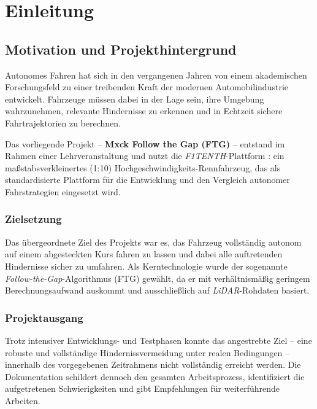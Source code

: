 \chapter{Einleitung}
\label{chap:einleitung}

\section{Motivation und Projekthintergrund}
\label{sec:motivation}

Autonomes Fahren hat sich in den vergangenen Jahren von einem
akademischen Forschungsfeld zu einer treibenden Kraft der modernen
Automobilindustrie entwickelt.
Fahrzeuge müssen dabei in der Lage sein, ihre Umgebung wahrzunehmen,
relevante Hindernisse zu erkennen und in Echtzeit sichere Fahrtrajektorien
zu berechnen.

Das vorliegende Projekt -- \textbf{Mxck Follow the Gap (FTG)} --
entstand im Rahmen einer Lehrveranstaltung und nutzt die
\emph{F1TENTH}-Plattform \cite{okelly2020f1tenth}: ein
maßstabsverkleinertes (1:10) Hochgeschwindigkeits-Rennfahrzeug,
das als standardisierte Plattform für die Entwicklung und den
Vergleich autonomer Fahrstrategien eingesetzt wird.

\subsection*{Zielsetzung}

Das übergeordnete Ziel des Projekts war es, das Fahrzeug
vollständig autonom auf einem abgesteckten Kurs fahren zu lassen
und dabei alle auftretenden Hindernisse sicher zu umfahren.
Als Kerntechnologie wurde der sogenannte
\emph{Follow-the-Gap}-Algorithmus (FTG) \cite{sezer2012novel}
gewählt, da er mit verhältnismäßig geringem Berechnungsaufwand
auskommt und ausschließlich auf \emph{LiDAR}-Rohdaten basiert.

\subsection*{Projektausgang}

Trotz intensiver Entwicklungs- und Testphasen konnte das
angestrebte Ziel -- eine robuste und vollständige
Hindernissvermeidung unter realen Bedingungen -- innerhalb des
vorgegebenen Zeitrahmens nicht vollständig erreicht werden.
Die Dokumentation schildert dennoch den gesamten Arbeitsprozess,
identifiziert die aufgetretenen Schwierigkeiten und gibt Empfehlungen
für weiterführende Arbeiten.

